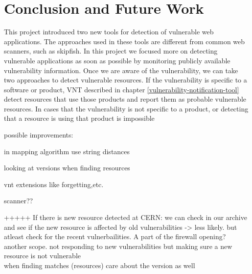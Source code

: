 \chapter{Conclusion and Future Work}
\label{conclusion-and-future-work}
\thispagestyle{empty}

This project introduced two new tools for detection of vulnerable web applications. The approaches used in these tools are different from common web scanners, such as skipfish. In this project we focused more on detecting vulnerable applications as soon as possible by monitoring publicly available vulnerability information. Once we are aware of the vulnerability, we can take two approaches to detect vulnerable resources. If the vulnerability is specific to a software or product, VNT described in chapter \ref{vulnerability-notification-tool} detect resources that use those products and report them as probable vulnerable resources. In cases that the vulnerability is not specific to a product, or detecting that a resource is using that product is impossible



possible improvements:

in mapping algorithm use string distances

looking at versions when finding resources

vnt extensions like forgetting,etc. 

scanner??


+++++
If there is new resource detected at CERN: we can check in our archive and see if the new resource is affected by old vulnerabilities -> less likely. but atleast check for the recent vulnerbailities. A part of the firewall opening? 
another scope. not responding to new vulnerabilities but making sure a new resource is not vulnerable
\\
when finding matches (resources) care about the version as well



